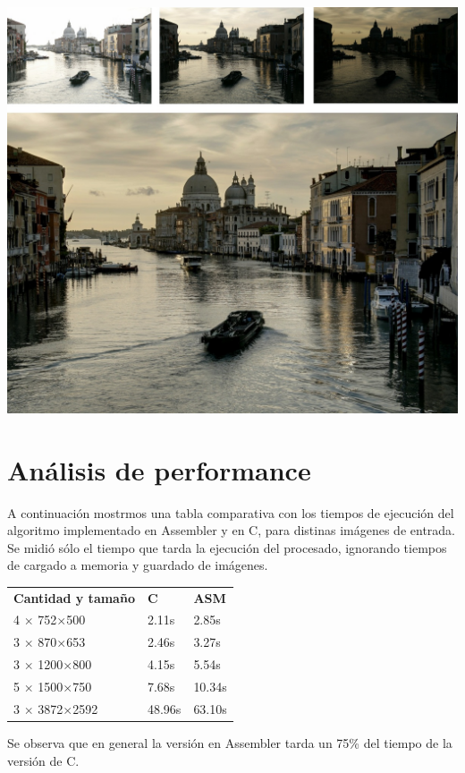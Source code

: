 \documentclass[a4paper,10pt]{article}
\begin{document}
        \includegraphics[width=\textwidth]{fused4.jpg}

    \section{Análisis de performance}
    
        A continuación mostrmos una tabla comparativa con los tiempos de ejecución del algoritmo implementado en Assembler y en C, para distinas imágenes de entrada. Se midió sólo el tiempo que tarda la ejecución del procesado, ignorando tiempos de cargado a memoria y guardado de imágenes.

        \bigskip
        \begin{tabular}{lll}
        \textbf{Cantidad y tamaño} & \textbf{C} & \textbf{ASM}\\
        4 $\times$ 752$\times$500 & 2.11s & 2.85s\\
        3 $\times$ 870$\times$653 & 2.46s & 3.27s\\
        3 $\times$ 1200$\times$800 & 4.15s & 5.54s\\
        5 $\times$ 1500$\times$750 & 7.68s & 10.34s\\
        3 $\times$ 3872$\times$2592 & 48.96s & 63.10s\\
        \end{tabular}
        \bigskip
        
        Se observa que en general la versión en Assembler tarda un 75\% del tiempo de la versión de C.
\end{document}
